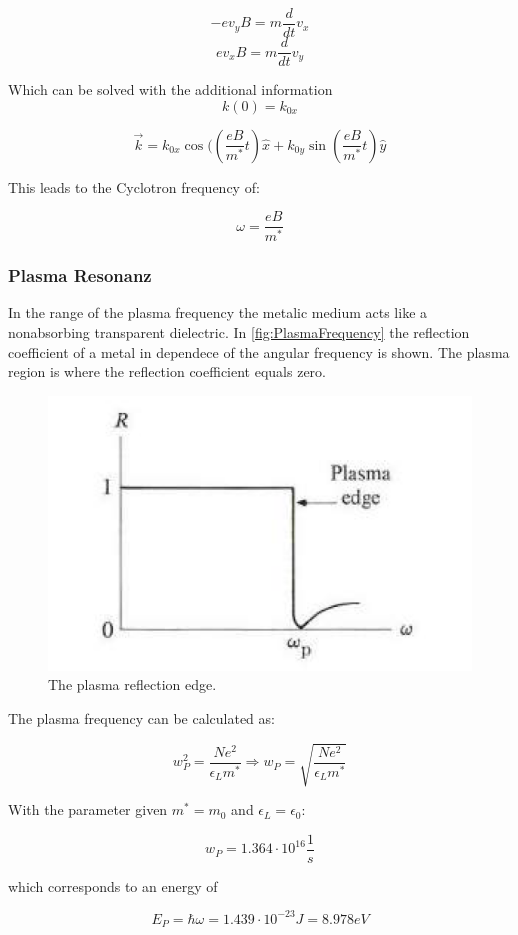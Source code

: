 $$-e v_y B = m \frac{d}{dt}v_x$$
$$e v_x B = m \frac{d}{dt}v_y$$

Which can be solved with the additional information $$k(0) = k_{0x}$$

$$\vec{k} = k_{0x} \cos(\left(\frac{eB}{m^*}t\right) \hat{x} +  k_{0y} \sin \left(\frac{eB}{m^*}t\right) \hat{y}$$

This leads to the Cyclotron frequency of:

$$\omega = \frac{eB}{m^*}$$

\subsubsection*{Plasma Resonanz}

In the range of the plasma frequency the metalic medium acts
like a nonabsorbing transparent dielectric.
In \autoref{fig:PlasmaFrequency} the reflection coefficient
of a metal in dependece of the angular frequency is shown. 
The plasma region is where the reflection coefficient equals 
zero.

\begin{figure}[H]
    \centering
    \includegraphics[width=0.6\linewidth]{Graphics/Chapter1/PlasmaFrequency.png}
    \caption{The plasma reflection edge.
    \cite[Elementary Solid State Physics p. 166]{elementary_SSP} }
    \label{fig:PlasmaFrequency}
\end{figure}

The plasma frequency can be calculated as:

\begin{equation}
    w_P^2 = \frac{Ne^2}{\epsilon_L m^*} \Rightarrow w_P = \sqrt{\frac{Ne^2}{\epsilon_L m^*}}
\end{equation}

With the parameter given $m^*=m_0$ and $\epsilon_L = \epsilon_0$:

$$w_P = 1.364 \cdot 10^{16} \frac{1}{s}$$

which corresponds to an energy of 

$$E_P = \hbar \omega = 1.439\cdot 10^{-23}J = 8.978eV$$